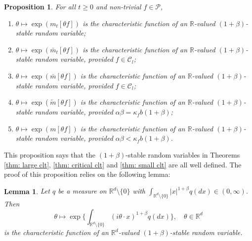 \documentclass[12pt,a4paper]{amsart}
\theoremstyle{plain}
\newtheorem{lem}[thm]{Lemma}
\newtheorem{prop}[thm]{Proposition}
\theoremstyle{definition}
\numberwithin{equation}{section}
\begin{document}
\begin{prop}
  \label{prop: alpha stable rv}
	For all $t\geq 0$ and non-trivial $f\in \mathcal P$,
  \begin{enumerate}
  \item
    \label{item: stable 1}
    $\theta \mapsto \exp(m_t[\theta f])$ is the characteristic function of an $\mathbb R$-valued $(1+\beta)$-stable random variable;
  \item
    \label{item: stable 2}
    $\theta \mapsto \exp(\bar{m}_t[\theta f])$ is the characteristic function of an $\mathbb R$-valued $(1+\beta)$-stable random variable, provided $f \in \mathcal C_l$;
  \item
    \label{item: stable 3}
    $\theta \mapsto \exp(\bar m[\theta f])$ is the characteristic function of an $\mathbb R$-valued $(1+\beta)$-stable random variable, provided $f \in \mathcal C_l$;
  \item
    \label{item: stable 4}
    $\theta \mapsto \exp(\widetilde m[\theta f])$ is the characteristic function of an $\mathbb R$-valued $(1+\beta)$-stable random variable, provided $\alpha\beta=\kappa_f b(1+\beta)$;
  \item
    \label{item: stable 5}
    $\theta \mapsto \exp(m[\theta f])$ is the characteristic function of an $\mathbb R$-valued $(1+\beta)$-stable random variable, provided $\alpha\beta < \kappa_f b(1+\beta)$.
  \end{enumerate}
\end{prop}
This proposition says that the $(1+\beta)$-stable random variables  in Theorems \ref{thm: large clt}, \ref{thm: critical clt} and \ref{thm: small clt} are all well defined.
The proof of this proposition relies on the following lemma:
\begin{lem}
  \label{lem: charactreisticfunction}
  Let $q$ be a measure on $\mathbb R^d\setminus\{0\}$ with
  $\int_{\mathbb R^d\setminus\{0\}} |x|^{1+\beta} q(dx) \in (0,\infty)$.
  Then
  \[
    \theta 
    \mapsto  \exp\Big\{\int_{\mathbb R^d\setminus\{0\}} (i\theta \cdot x)^{1+\beta} q(dx)\Big\},
    \quad \theta \in \mathbb R^d
  \]
  is the characteristic function of an $\mathbb R^d$-valued $(1+\beta)$-stable random variable.
\end{lem}
\end{document}
